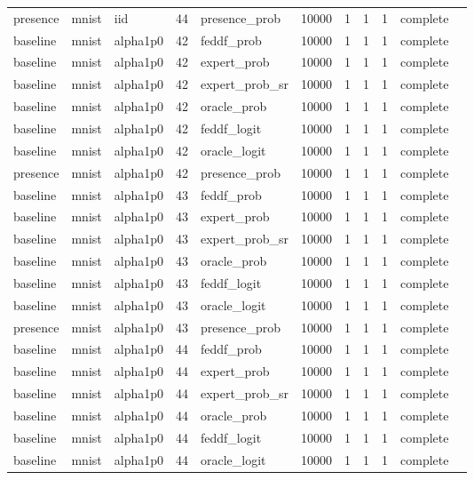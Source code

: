 \begin{tabular}{lllrlrrrrll}
presence & mnist & iid & 44 & presence\_prob & 10000 & 1 & 1 & 1 & complete &  \\
baseline & mnist & alpha1p0 & 42 & feddf\_prob & 10000 & 1 & 1 & 1 & complete &  \\
baseline & mnist & alpha1p0 & 42 & expert\_prob & 10000 & 1 & 1 & 1 & complete &  \\
baseline & mnist & alpha1p0 & 42 & expert\_prob\_sr & 10000 & 1 & 1 & 1 & complete &  \\
baseline & mnist & alpha1p0 & 42 & oracle\_prob & 10000 & 1 & 1 & 1 & complete &  \\
baseline & mnist & alpha1p0 & 42 & feddf\_logit & 10000 & 1 & 1 & 1 & complete &  \\
baseline & mnist & alpha1p0 & 42 & oracle\_logit & 10000 & 1 & 1 & 1 & complete &  \\
presence & mnist & alpha1p0 & 42 & presence\_prob & 10000 & 1 & 1 & 1 & complete &  \\
baseline & mnist & alpha1p0 & 43 & feddf\_prob & 10000 & 1 & 1 & 1 & complete &  \\
baseline & mnist & alpha1p0 & 43 & expert\_prob & 10000 & 1 & 1 & 1 & complete &  \\
baseline & mnist & alpha1p0 & 43 & expert\_prob\_sr & 10000 & 1 & 1 & 1 & complete &  \\
baseline & mnist & alpha1p0 & 43 & oracle\_prob & 10000 & 1 & 1 & 1 & complete &  \\
baseline & mnist & alpha1p0 & 43 & feddf\_logit & 10000 & 1 & 1 & 1 & complete &  \\
baseline & mnist & alpha1p0 & 43 & oracle\_logit & 10000 & 1 & 1 & 1 & complete &  \\
presence & mnist & alpha1p0 & 43 & presence\_prob & 10000 & 1 & 1 & 1 & complete &  \\
baseline & mnist & alpha1p0 & 44 & feddf\_prob & 10000 & 1 & 1 & 1 & complete &  \\
baseline & mnist & alpha1p0 & 44 & expert\_prob & 10000 & 1 & 1 & 1 & complete &  \\
baseline & mnist & alpha1p0 & 44 & expert\_prob\_sr & 10000 & 1 & 1 & 1 & complete &  \\
baseline & mnist & alpha1p0 & 44 & oracle\_prob & 10000 & 1 & 1 & 1 & complete &  \\
baseline & mnist & alpha1p0 & 44 & feddf\_logit & 10000 & 1 & 1 & 1 & complete &  \\
baseline & mnist & alpha1p0 & 44 & oracle\_logit & 10000 & 1 & 1 & 1 & complete &  \\

\end{tabular}
